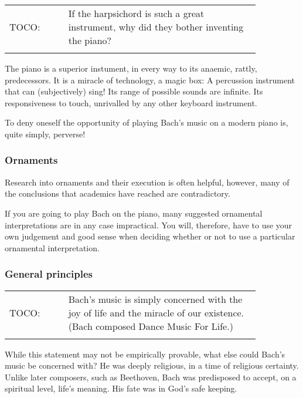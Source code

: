 \documentclass{article}
\begin{document}
\begin{tabular}{p{0.2\linewidth}p{0.65\linewidth}}
    \\
    TOCO: & If the harpsichord is such a great instrument, why did they bother inventing the piano?\\
    \\
\end{tabular}

The piano is a superior instument, in every way to its anaemic, rattly, predecessors.
It is a miracle of technology, a magic box: A percussion instrument that can (subjectively) sing!
Its range of possible sounds are infinite.
Its responsiveness to touch, unrivalled by any other keyboard instrument.

To deny oneself the opportunity of playing Bach's music on a modern piano is, quite simply, perverse!

\subsubsection{Ornaments}

Research into ornaments and their execution is often helpful, however, many of the conclusions that academics have reached are contradictory.

If you are going to play Bach on the piano, many suggested ornamental interpretations are in any case  impractical.
You will, therefore, have to use your own judgement and good sense when deciding whether or not to use a particular ornamental interpretation.

\subsubsection{General principles}

\begin{tabular}{p{0.2\linewidth}p{0.65\linewidth}}
    \\
    TOCO: & Bach's music is simply concerned with the joy of life and the miracle of our existence.
    (Bach composed Dance Music For Life.)\\
    \\
\end{tabular}

While this statement may not be empirically provable, what else could Bach's music be concerned with?
He was deeply religious, in a time of religious certainty.
Unlike later composers, such as Beethoven, Bach was predisposed to accept, on a spiritual level, life's meaning.
His fate was in God's safe keeping.
\end{document}
